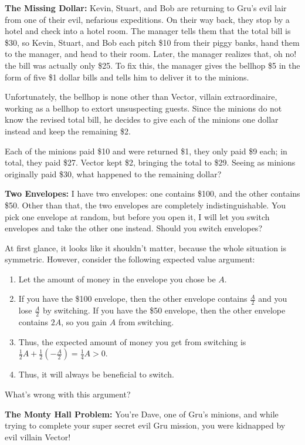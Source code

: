 \documentclass{article}
\begin{document}
\begin{multicols}{3}
\textbf{The Missing Dollar:} 
Kevin, Stuart, and Bob are returning to Gru’s evil lair from one of their evil, nefarious expeditions. On their way back, they stop by a hotel and check into a hotel room. The manager tells them that the total bill is \$30, so Kevin, Stuart, and Bob each pitch \$10 from their piggy banks, hand them to the manager, and head to their room. Later, the manager realizes that, oh no! the bill was actually only \$25. To fix this, the manager gives the bellhop \$5 in the form of five \$1 dollar bills and tells him to deliver it to the minions. 

Unfortunately, the bellhop is none other than Vector, villain extraordinaire, working as a bellhop to extort unsuspecting guests. Since the minions do not know the revised total bill, he decides to give each of the minions one dollar instead and keep the remaining \$2. 

Each of the minions paid \$10 and were returned \$1, they only paid \$9 each; in total, they paid \$27. Vector kept \$2, bringing the total to \$29. Seeing as minions originally paid \$30, what happened to the remaining dollar?

\textbf{Two Envelopes:}
I have two envelopes: one contains \$100, and the other contains \$50. Other than that, the two envelopes are completely indistinguishable. You pick one envelope at random, but before you open it, I will let you switch envelopes and take the other one instead. Should you switch envelopes?

At first glance, it looks like it shouldn’t matter, because the whole situation is symmetric. However, consider the following expected value argument:
\begin{enumerate}
	\item Let the amount of money in the envelope you chose be $A$. 
\item If you have the \$100 envelope, then the other envelope contains $\frac A2$ and you lose $\frac A2$ by switching. If you have the \$50 envelope, then the other envelope contains $2A$, so you gain $A$ from switching.
	\item Thus, the expected amount of money you get from switching is $\frac12A+\frac12(-\frac A2)=\frac14A>0$. 
	\item Thus, it will always be beneficial to switch.
\end{enumerate}
 
What’s wrong with this argument?

\textbf{The Monty Hall Problem:}
You're Dave, one of Gru's minions, and while trying to complete your super secret evil Gru mission, you were kidnapped by evil villain Vector! 


\end{multicols}
\end{document}
